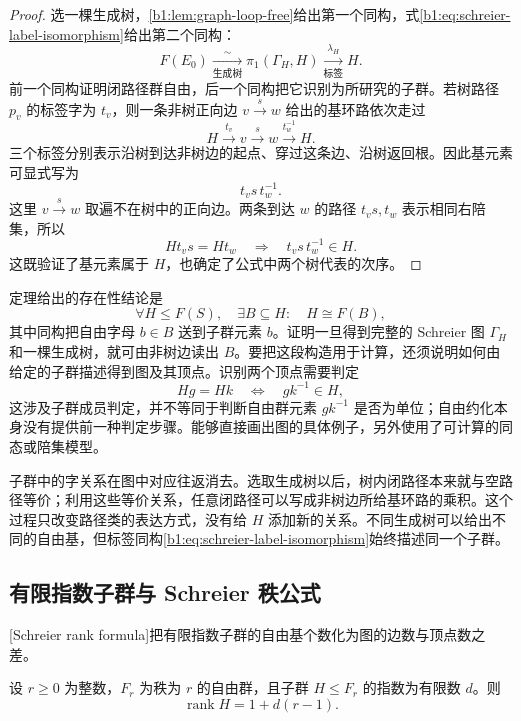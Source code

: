 \begin{proof}
	选一棵生成树，\cref{b1:lem:graph-loop-free}给出第一个同构，式\eqref{b1:eq:schreier-label-isomorphism}给出第二个同构：
	\[
		F(E_0)\xrightarrow[\text{生成树}]{\sim} \pi_1(\Gamma_H,H)\xrightarrow[\text{标签}]{\lambda_H}H.
	\]
	前一个同构证明闭路径群自由，后一个同构把它识别为所研究的子群。若树路径 \(p_v\) 的标签字为 \(t_v\)，则一条非树正向边 \(v\xrightarrow{s}w\) 给出的基环路依次走过
	\[
		H\xrightarrow{t_v}v\xrightarrow{s}w\xrightarrow{t_w^{-1}}H.
	\]
	三个标签分别表示沿树到达非树边的起点、穿过这条边、沿树返回根。因此基元素可显式写为
	\begin{equation}\label{b1:eq:schreier-basis}
		t_v s\,t_w^{-1}.
	\end{equation}
	这里 \(v\xrightarrow{s}w\) 取遍不在树中的正向边。两条到达 \(w\) 的路径 \(t_vs,t_w\) 表示相同右陪集，所以
	\[
		Ht_vs=Ht_w\quad\Longrightarrow\quad t_vs\,t_w^{-1}\in H.
	\]
	这既验证了基元素属于 \(H\)，也确定了公式中两个树代表的次序。
\end{proof}

定理给出的存在性结论是
\[
	\forall H\le F(S),\quad \exists B\subseteq H:\quad H\cong F(B),
\]
其中同构把自由字母 \(b\in B\) 送到子群元素 \(b\)。证明一旦得到完整的 Schreier 图 \(\Gamma_H\) 和一棵生成树，就可由非树边读出 \(B\)。要把这段构造用于计算，还须说明如何由给定的子群描述得到图及其顶点。识别两个顶点需要判定
\[
	Hg=Hk\quad\Longleftrightarrow\quad gk^{-1}\in H,
\]
这涉及子群成员判定，并不等同于判断自由群元素 \(gk^{-1}\) 是否为单位；自由约化本身没有提供前一种判定步骤。能够直接画出图的具体例子，另外使用了可计算的同态或陪集模型。

\ProseParagraphBreak
子群中的字关系在图中对应往返消去。选取生成树以后，树内闭路径本来就与空路径等价；利用这些等价关系，任意闭路径可以写成非树边所给基环路的乘积。这个过程只改变路径类的表达方式，没有给 \(H\) 添加新的关系。不同生成树可以给出不同的自由基，但标签同构\eqref{b1:eq:schreier-label-isomorphism}始终描述同一个子群。

\subsection{有限指数子群与 Schreier 秩公式}
\label{b1:subsec:0804:02}

[Schreier rank formula]把有限指数子群的自由基个数化为图的边数与顶点数之差。

\begin{theorem}\label{b1:thm:schreier-rank}
	设 \(r\geq0\) 为整数，\(F_r\) 为秩为 \(r\) 的自由群，且子群 \(H\le F_r\) 的指数为有限数 \(d\)。则
	\[
		\operatorname{rank}H=1+d(r-1).
	\]
\end{theorem}

